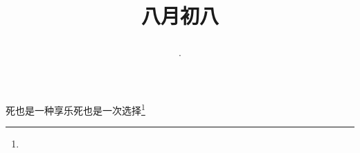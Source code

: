 \title{\date[d=10,m=9,y=2024][year:cn-y,年,month:cn,day:cn,日,·,weekday]·八月初八 }
死也是一种享乐死也是一次选择\footnote{ }

